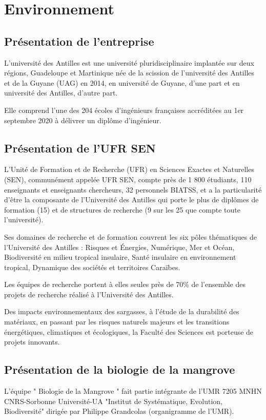 \chapter{Environnement}
\minitoc

    \section{Présentation de l'entreprise}
    L’université des Antilles est une université pluridisciplinaire implantée sur deux régions, Guadeloupe et Martinique née de la scission de l’université des Antilles et de la Guyane (UAG) en 2014, en université de Guyane, d’une part et en université des Antilles, d’autre part.

    Elle comprend l'une des 204 écoles d'ingénieurs françaises accréditées au 1er septembre 2020 à délivrer un diplôme d'ingénieur.

    \section{Présentation de l'UFR SEN}
    L’Unité de Formation et de Recherche (UFR) en Sciences Exactes et Naturelles (SEN), communément appelée UFR SEN, compte près de 1 800 étudiants, 110 enseignants et enseignants chercheurs, 32 personnels BIATSS, et a la particularité d’être la composante de l’Université des Antilles qui porte le plus de diplômes de formation (15) et de structures de recherche (9 sur les 25 que compte toute l’université). 
    
    Ses domaines de recherche et de formation couvrent les six pôles thématiques de l’Université des Antilles : Risques et Énergies, Numérique, Mer et Océan, Biodiversité en milieu tropical insulaire, Santé insulaire en environnement tropical, Dynamique des sociétés et territoires Caraïbes.
    
    Les équipes de recherche portent à elles seules près de 70\% de l’ensemble des projets de recherche réalisé à l’Université des Antilles.
    
    Des impacts environnementaux des sargasses, à l’étude de la durabilité des matériaux, en passant par les risques naturels majeurs et les transitions énergétiques, climatiques et écologiques, la Faculté des Sciences est porteuse de projets innovants. 

    \section{Présentation de la biologie de la mangrove}
    L'équipe " Biologie de la Mangrove " fait partie intégrante de l'UMR 7205 MNHN CNRS-Sorbonne Université-UA "Institut de Systématique, Evolution, Biodiversité" dirigée par Philippe Grandcolas (organigramme de l'UMR).

